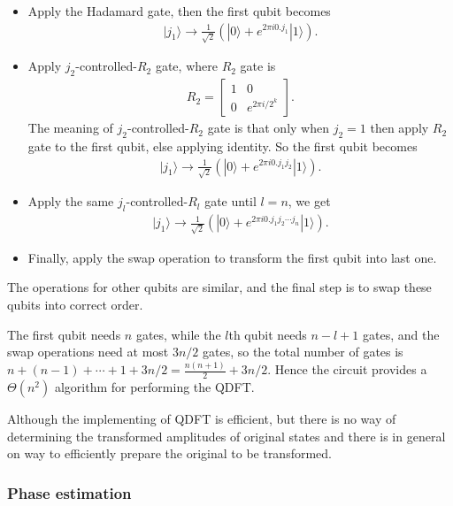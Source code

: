 \documentclass{article}
\newcommand{\ket}[1]{| #1 \rangle}  %
\begin{document}
\begin{itemize}
	\item Apply the Hadamard gate, then the first qubit becomes 
	\begin{align}
		\ket{j_1} \rightarrow \frac{1}{\sqrt{2}} \left( \ket{0}+e^{2\pi i 0.j_1} \ket{1}\right).
	\end{align}

	\item Apply $j_2$-controlled-$R_2$ gate, where $R_2$ gate is
	\begin{align}
		R_2 = \left[ \begin{array}{cc} 1&0\\ 0&e^{2\pi i/2^k} \end{array} \right].
	\end{align}
	The meaning of $j_2$-controlled-$R_2$ gate is that only when $j_2=1$ then apply $R_2$ gate to the first qubit, else applying identity. So the first qubit becomes
	\begin{align}
		\ket{j_1} \rightarrow \frac{1}{\sqrt{2}} \left( \ket{0}+e^{2\pi i 0.j_1j_2} \ket{1}\right).
	\end{align}

	\item Apply the same $j_l$-controlled-$R_l$ gate until $l=n$, we get
	\begin{align}
		\ket{j_1} \rightarrow \frac{1}{\sqrt{2}} \left( \ket{0}+e^{2\pi i 0.j_1j_2\cdots j_n} \ket{1}\right).
	\end{align}

	\item Finally, apply the swap operation to transform the first qubit into last one.
\end{itemize} 
The operations for other qubits are similar, and the final step is to swap these qubits into correct order.

The first qubit needs $n$ gates, while the $l$th qubit needs $n-l+1$ gates, and the swap operations need at most $3n/2$ gates, so the total number of gates is $n+(n-1)+\cdots+1+3n/2= \frac{n(n+1)}{2}+3n/2$. Hence the circuit provides a $\Theta(n^2)$ algorithm for performing the QDFT. 

Although the implementing of QDFT is efficient, but there is no way of determining the transformed amplitudes of original states and there is in general on way to efficiently prepare the original to be transformed.




\subsubsection{Phase estimation}
\end{document}
